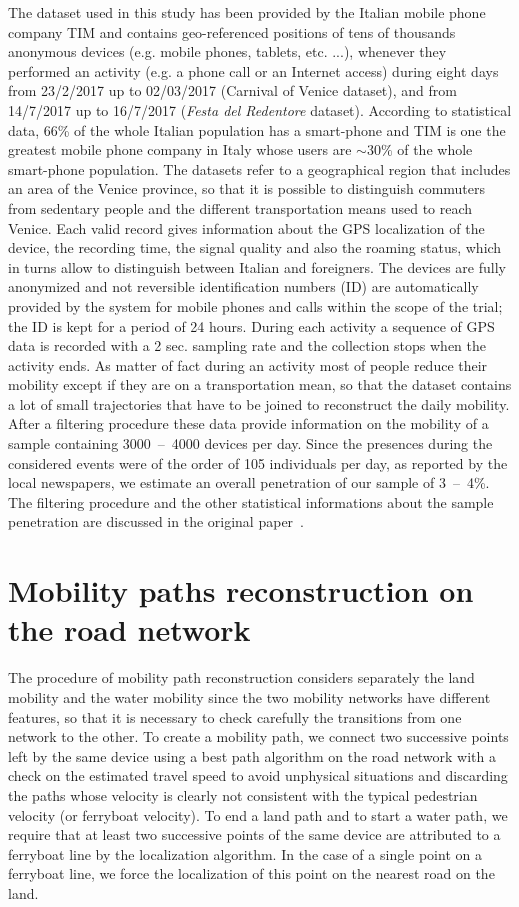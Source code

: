 \documentclass{standalone}
\begin{document}
The dataset used in this study has been provided by the Italian mobile phone company TIM and contains geo-referenced positions of tens of thousands anonymous devices (e.g. mobile phones, tablets, etc. ...), whenever they performed an activity (e.g. a phone call or an Internet access) during eight days from 23/2/2017 up to 02/03/2017 (Carnival of Venice dataset), and from 14/7/2017 up to 16/7/2017 (\emph{Festa del Redentore} dataset).
According to statistical data, 66\% of the whole Italian population has a smart-phone and TIM is one the greatest mobile phone company in Italy whose users are $\sim30\%$ of the whole smart-phone population.
The datasets refer to a geographical region that includes an area of the Venice province, so that it is possible to distinguish commuters from sedentary people and the different transportation means used to reach Venice.
Each valid record gives information about the GPS localization of the device, the recording time, the signal quality and also the roaming status, which in turns allow to distinguish between Italian and
foreigners.
The devices are fully anonymized and not reversible identification numbers (ID) are automatically provided by the system for mobile phones and calls within the scope of the trial; the ID is kept for a period of 24 hours.
During each activity a sequence of GPS data is recorded with a 2 sec. sampling rate and the collection stops when the activity ends.
As matter of fact during an activity most of people reduce their mobility except if they are on a transportation mean, so that the dataset contains a lot of small trajectories that have to be joined to reconstruct the daily mobility.
After a filtering procedure these data provide information on the mobility of a sample containing 3000~–~4000 devices per day.
Since the presences during the considered events were of the order of 105 individuals per day, as reported by the local newspapers, we estimate an overall penetration of our sample of 3~–~4\%.
The filtering procedure and the other statistical informations about the sample penetration are discussed in the original paper~\cite{Mizzi2018}.

\section*{Mobility paths reconstruction on the road network}

The procedure of mobility path reconstruction considers separately the land mobility and the water mobility since the two mobility networks have different features, so that it is necessary to check carefully the transitions from one network to the other.
To create a mobility path, we connect two successive points left by the same device using a best path algorithm on the road network with a check on the estimated travel speed to avoid unphysical situations and discarding the paths whose velocity is clearly not consistent with
the typical pedestrian velocity (or ferryboat velocity).
To end a land path and to start a water path, we require that at least two successive points of the same device are attributed to a ferryboat line by the localization algorithm.
In the case of a single point on a ferryboat line, we force the localization of this point on the nearest road on the land.
\end{document}
